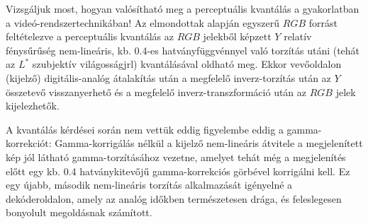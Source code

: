 Vizsgáljuk most, hogyan valósítható meg a perceptuális kvantálás a gyakorlatban a videó-rendszertechnikában!
Az elmondottak alapján egyszerű $RGB$ forrást feltételezve a perceptuális kvantálás az $RGB$ jelekből képzett $Y$ relatív fénysűrűség nem-lineáris, kb. 0.4-es hatványfüggvénnyel való torzítás utáni (tehát az $L^*$ szubjektív világosságjrl) kvantálásával oldható meg.
Ekkor vevőoldalon (kijelző) digitális-analóg átalakítás után a megfelelő inverz-torzítás után az $Y$ összetevő visszanyerhető és a megfelelő inverz-transzformáció után az $RGB$ jelek kijelezhetők.

A kvantálás kérdései során nem vettük eddig figyelembe eddig a gamma-korrekciót: 
Gamma-korrigálás nélkül a kijelző nem-lineáris átvitele a megjelenített kép jól látható gamma-torzításához vezetne, amelyet tehát még a megjelenítés előtt egy kb. 0.4 hatványkitevőjű gamma-korrekciós görbével korrigálni kell.
Ez egy újabb, második nem-lineáris torzítás alkalmazását igényelné a dekóderoldalon, amely az analóg időkben természetesen drága, és feleslegesen bonyolult megoldásnak számított.

